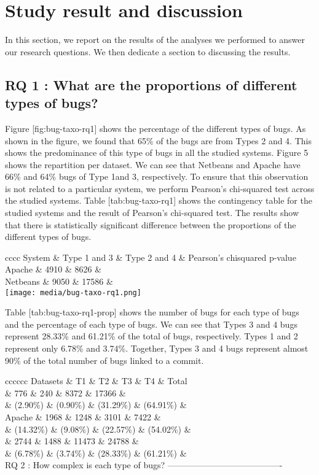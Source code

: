 \section{Study result and discussion}\label{study-result-and-discussion}

In this section, we report on the results of the analyses we performed
to answer our research questions. We then dedicate a section to
discussing the results.

\subsection{RQ 1 : What are the proportions of different types of
bugs?}\label{rq-1-what-are-the-proportions-of-different-types-of-bugs-1}

Figure {[}fig:bug-taxo-rq1{]} shows the percentage of the different
types of bugs. As shown in the figure, we found that 65\% of the bugs
are from Types 2 and 4. This shows the predominance of this type of bugs
in all the studied systems. Figure 5 shows the repartition per dataset.
We can see that Netbeans and Apache have 66\% and 64\% bugs of Type 1and
3, respectively. To ensure that this observation is not related to a
particular system, we perform Pearson's chi-squared test across the
studied systems. Table {[}tab:bug-taxo-rq1{]} shows the contingency
table for the studied systems and the result of Pearson's chi-squared
test. The results show that there is statistically significant
difference between the proportions of the different types of bugs.

{c\textbar{}c\textbar{}c\textbar{}c} {System} \& {Type 1 and 3} \& {Type
2 and 4} \& {Pearson's chisquared p-value}\\
Apache \& 4910 \& 8626 \&\\
Netbeans \& 9050 \& 17586 \&\\
\texttt{[image: media/bug-taxo-rq1.png]}

Table {[}tab:bug-taxo-rq1-prop{]} shows the number of bugs for each type
of bugs and the percentage of each type of bugs. We can see that Types 3
and 4 bugs represent 28.33\% and 61.21\% of the total of bugs,
respectively. Types 1 and 2 represent only 6.78\% and 3.74\%. Together,
Types 3 and 4 bugs represent almost 90\% of the total number of bugs
linked to a commit.

{c\textbar{}c\textbar{}c\textbar{}c\textbar{}c\textbar{}c} Datasets \&
T1 \& T2 \& T3 \& T4 \& Total\\
\& 776 \& 240 \& 8372 \& 17366 \&\\
\& (2.90\%) \& (0.90\%) \& (31.29\%) \& (64.91\%) \&\\
Apache \& 1968 \& 1248 \& 3101 \& 7422 \&\\
\& (14.32\%) \& (9.08\%) \& (22.57\%) \& (54.02\%) \&\\
\& 2744 \& 1488 \& 11473 \& 24788 \&\\
\& (6.78\%) \& (3.74\%) \& (28.33\%) \& (61.21\%) \&\\
RQ 2 : How complex is each type of bugs?
----------------------------------------


